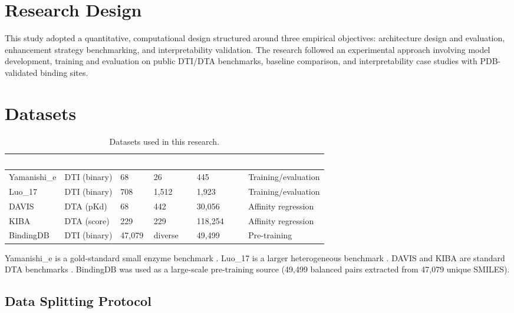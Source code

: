 \documentclass[12pt,a4paper,oneside]{report}
\begin{document}
\section{Research Design}

This study adopted a quantitative, computational design structured around three empirical objectives: architecture design and evaluation, enhancement strategy benchmarking, and interpretability validation. The research followed an experimental approach involving model development, training and evaluation on public DTI/DTA benchmarks, baseline comparison, and interpretability case studies with PDB-validated binding sites.

\section{Datasets}

\begin{table}[htbp]
\centering
\caption{Datasets used in this research.}
\begin{tabular}{@{}L{2cm}L{2.2cm}C{1.2cm}C{1.2cm}C{1.8cm}L{2.5cm}@{}}
\toprule
{}
\textcolor{white}{\textbf{Dataset}} &
\textcolor{white}{\textbf{Task}} &
\textcolor{white}{\textbf{Drugs}} &
\textcolor{white}{\textbf{Proteins}} &
\textcolor{white}{\textbf{Pos.\ Pairs}} &
\textcolor{white}{\textbf{Use}} \\
\midrule
{}
Yamanishi\_e & DTI (binary) & 68 & 26 & 445 & Training/evaluation \\
Luo\_17 & DTI (binary) & 708 & 1,512 & 1,923 & Training/evaluation \\
DAVIS & DTA (pKd) & 68 & 442 & 30,056 & Affinity regression \\
KIBA & DTA (score) & 229 & 229 & 118,254 & Affinity regression \\
BindingDB & DTI (binary) & 47,079 & diverse & 49,499 & Pre-training \\
\bottomrule
\end{tabular}
\label{tab:datasets}
\end{table}

Yamanishi\_e is a gold-standard small enzyme benchmark \citep{yamanishi2008}. Luo\_17 is a larger heterogeneous benchmark \citep{luo2017network}. DAVIS and KIBA are standard DTA benchmarks \citep{ozturk2018deepdta}. BindingDB was used as a large-scale pre-training source (49,499 balanced pairs extracted from 47,079 unique SMILES).

\subsection{Data Splitting Protocol}
\end{document}
